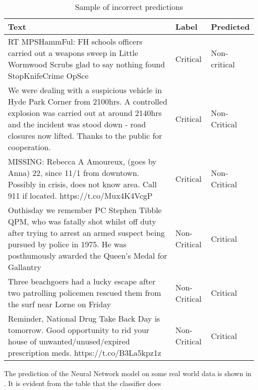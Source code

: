 \begin{table}
\begin{center}
\caption{Sample of incorrect predictions}
\label{tbl:incorrect_predictions}
\begin{tabular}{p{10cm}p{2cm}p{2cm}}
\toprule 
Text&Label&Predicted\\
\midrule 
RT MPSHammFul: FH schools officers carried out a weapons sweep in Little Wormwood Scrubs glad to say nothing found StopKnifeCrime OpSce&Critical&Non-critical\\
\hline
We were dealing with a suspicious vehicle in Hyde Park Corner from 2100hrs. A controlled explosion was carried out at around 2140hrs and the incident was stood down - road closures now lifted. Thanks to the public for cooperation.&Critical&Non-Critical\\
\hline
MISSING:  Rebecca A Amoureux, (goes by Anna) 22, since 11/1 from downtown. Possibly in crisis, does not know area.  Call 911 if located. https://t.co/Mux4K4VcgP&Critical&Non-Critical\\
\hline
Onthisday we remember PC Stephen Tibble QPM, who was fatally shot whilst off duty after trying to arrest an armed suspect being pursued by police in 1975. He was posthumously awarded the Queen’s Medal for Gallantry&Non-Critical&Critical\\
\hline
Three beachgoers had a lucky escape after two patrolling policemen rescued them from the surf near Lorne on Friday&Non-Critical&Critical\\
\hline
Reminder, National Drug Take Back Day is tomorrow.  Good opportunity to rid your house of unwanted/unused/expired prescription meds. https://t.co/B3La5kpz1z&Non-Critical&Critical\\
\bottomrule
\end{tabular}
\end{center}
\end{table}

The prediction of the Neural Network model on some real world data is shown in . It is evident from the table that the classifier does 

